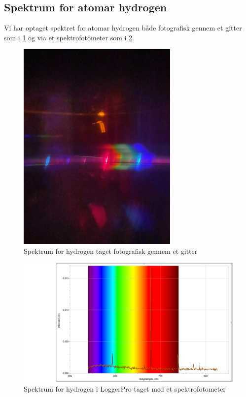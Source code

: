 \documentclass[11pt]{article}
\theoremstyle{definition}
\begin{document}
\subsection{Spektrum for atomar hydrogen}
Vi har optaget spektret for atomar hydrogen både fotografisk gennem et gitter som i \cref{fig:spektrum} og via et spektrofotometer som i \cref{fig:spektrum2}.
\begin{figure}[H]
\begin{center}
  \includegraphics[width=0.7\textwidth]{spektrum.jpeg}
\end{center}
\caption{Spektrum for hydrogen taget fotografisk gennem et gitter}
\label{fig:spektrum}
\end{figure}
\begin{figure}[H]
\begin{center}
  \includegraphics[width=\textwidth]{spektrum2.png}
\end{center}
\caption{Spektrum for hydrogen i LoggerPro taget med et spektrofotometer}
\label{fig:spektrum2}
\end{figure}
\end{document}
